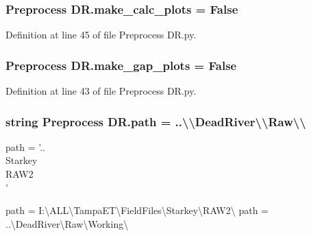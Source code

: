 \subsubsection[{make\+\_\+calc\+\_\+plots}]{\setlength{\rightskip}{0pt plus 5cm}Preprocess D\+R.\+make\+\_\+calc\+\_\+plots = False}\label{namespace_preprocess_01_d_r_aae343c994d5743a749e85f21f6ed62a2}


Definition at line 45 of file Preprocess D\+R.\+py.

\hypertarget{namespace_preprocess_01_d_r_ab7f2e80b89ea6ef3dd80564bcc64e272}{}
\subsubsection[{make\+\_\+gap\+\_\+plots}]{\setlength{\rightskip}{0pt plus 5cm}Preprocess D\+R.\+make\+\_\+gap\+\_\+plots = False}\label{namespace_preprocess_01_d_r_ab7f2e80b89ea6ef3dd80564bcc64e272}


Definition at line 43 of file Preprocess D\+R.\+py.

\hypertarget{namespace_preprocess_01_d_r_afebb93b679a374da12eb4267b59fb9f8}{}
\subsubsection[{path}]{\setlength{\rightskip}{0pt plus 5cm}string Preprocess D\+R.\+path = \textquotesingle{}..\textbackslash{}\textbackslash{}Dead\+River\textbackslash{}\textbackslash{}\+Raw\textbackslash{}\textbackslash{}\textquotesingle{}}\label{namespace_preprocess_01_d_r_afebb93b679a374da12eb4267b59fb9f8}


\begin{DoxyVerb}path = '..\\Starkey\\RAW2\\'
\end{DoxyVerb}
 path = \textquotesingle{}I\+:\textbackslash{}A\+L\+L\textbackslash{}Tampa\+E\+T\textbackslash{}Field\+Files\textbackslash{}Starkey\textbackslash{}R\+A\+W2\textbackslash{}\textquotesingle{} path = \textquotesingle{}..\textbackslash{}Dead\+River\textbackslash{}Raw\textbackslash{}Working\textbackslash{}\textquotesingle{} 



